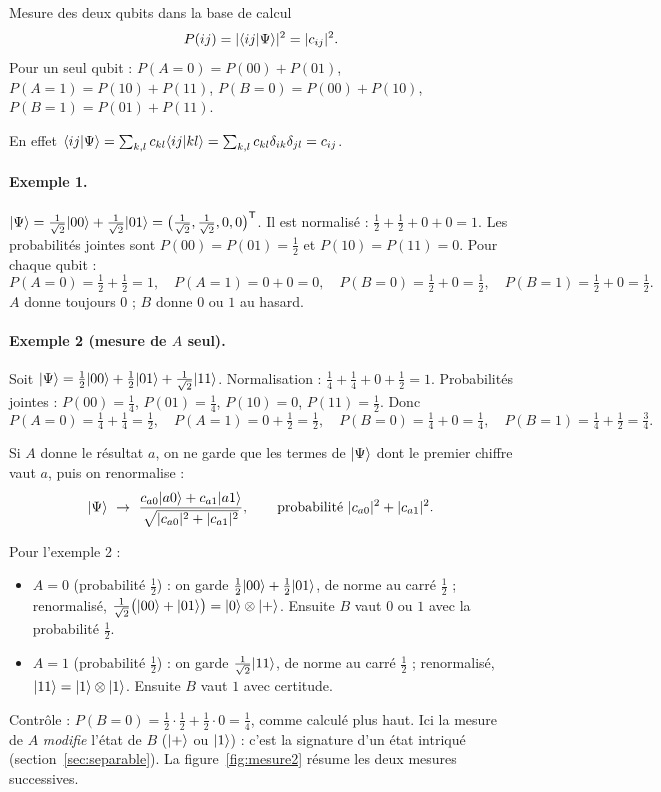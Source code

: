 \begin{resultat}{Mesure des deux qubits dans la base de calcul}
\[
  P(ij)=|\langle ij|\Psi\rangle|^2=|c_{ij}|^2 .
\]
Pour un seul qubit : $P(A{=}0)=P(00)+P(01)$, $P(A{=}1)=P(10)+P(11)$,
$P(B{=}0)=P(00)+P(10)$, $P(B{=}1)=P(01)+P(11)$.
\end{resultat}

En effet $\langle ij|\Psi\rangle=\sum_{k,l}c_{kl}\langle ij|kl\rangle=\sum_{k,l}c_{kl}\delta_{ik}\delta_{jl}=c_{ij}$.

\paragraph{Exemple 1.} $|\Psi\rangle=\frac{1}{\sqrt2}|00\rangle+\frac{1}{\sqrt2}|01\rangle
=\big(\tfrac{1}{\sqrt2},\tfrac{1}{\sqrt2},0,0\big)^{\mathsf T}$. Il est normalisé :
$\frac12+\frac12+0+0=1$. Les probabilités jointes sont
$P(00)=P(01)=\frac12$ et $P(10)=P(11)=0$. Pour chaque qubit :
\[
  P(A{=}0)=\tfrac12+\tfrac12=1,\quad P(A{=}1)=0+0=0,\quad
  P(B{=}0)=\tfrac12+0=\tfrac12,\quad P(B{=}1)=\tfrac12+0=\tfrac12 .
\]
$A$ donne toujours $0$ ; $B$ donne $0$ ou $1$ au hasard.

\paragraph{Exemple 2 (mesure de $A$ seul).} Soit
$|\Psi\rangle=\frac12|00\rangle+\frac12|01\rangle+\frac{1}{\sqrt2}|11\rangle$. Normalisation :
$\frac14+\frac14+0+\frac12=1$. Probabilités jointes : $P(00)=\frac14$, $P(01)=\frac14$,
$P(10)=0$, $P(11)=\frac12$. Donc
\[
  P(A{=}0)=\tfrac14+\tfrac14=\tfrac12,\quad P(A{=}1)=0+\tfrac12=\tfrac12,\quad
  P(B{=}0)=\tfrac14+0=\tfrac14,\quad P(B{=}1)=\tfrac14+\tfrac12=\tfrac34 .
\]

\begin{remarque}
Si $A$ donne le résultat $a$, on ne garde que les termes de $|\Psi\rangle$ dont le premier
chiffre vaut $a$, puis on renormalise :
\[
  \ket{\Psi}\ \to\ \frac{c_{a0}\ket{a0}+c_{a1}\ket{a1}}{\sqrt{|c_{a0}|^2+|c_{a1}|^2}},
  \qquad\text{probabilité }|c_{a0}|^2+|c_{a1}|^2 .
\]
\end{remarque}

Pour l'exemple 2 :
\begin{itemize}[nosep]
  \item $A=0$ (probabilité $\frac12$) : on garde $\frac12|00\rangle+\frac12|01\rangle$, de norme
        au carré $\frac12$ ; renormalisé, $\frac{1}{\sqrt2}\big(|00\rangle+|01\rangle\big)
        =|0\rangle\otimes|+\rangle$. Ensuite $B$ vaut $0$ ou $1$ avec la probabilité $\frac12$.
  \item $A=1$ (probabilité $\frac12$) : on garde $\frac{1}{\sqrt2}|11\rangle$, de norme au carré
        $\frac12$ ; renormalisé, $|11\rangle=|1\rangle\otimes|1\rangle$. Ensuite $B$ vaut $1$
        avec certitude.
\end{itemize}
Contrôle : $P(B{=}0)=\frac12\cdot\frac12+\frac12\cdot0=\frac14$, comme calculé plus haut.
Ici la mesure de $A$ \emph{modifie} l'état de $B$ ($|+\rangle$ ou $|1\rangle$) : c'est la
signature d'un état intriqué (section~\ref{sec:separable}). La figure~\ref{fig:mesure2} résume
les deux mesures successives.

